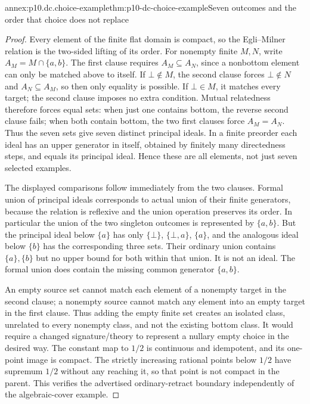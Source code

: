 \begin{annexitem}{annex:p10.dc.choice-example}{thm:p10-dc-choice-example}{Seven outcomes and the order that choice does not replace}
\begin{proof}
Every element of the finite flat domain is compact, so the Egli--Milner
relation is the two-sided lifting of its order. For nonempty finite
\(M,N\), write \(A_M=M\cap\{a,b\}\).
The first clause requires \(A_M\subseteq A_N\), since a nonbottom
element can only be matched above to itself. If \(\bot\notin M\),
the second clause forces \(\bot\notin N\) and
\(A_N\subseteq A_M\), so then only equality is possible.
If \(\bot\in M\), it matches every target; the second clause imposes
no extra condition. Mutual relatedness therefore forces equal sets:
when just one contains bottom, the reverse second clause fails; when
both contain bottom, the two first clauses force \(A_M=A_N\).
Thus the seven sets give seven distinct principal ideals.
In a finite preorder each ideal has an upper generator in itself,
obtained by finitely many directedness steps, and equals its principal
ideal. Hence these are all elements, not just seven selected examples.

The displayed comparisons follow immediately from the two clauses.
Formal union of principal ideals corresponds to actual union of their
finite generators, because the relation is reflexive and the union
operation preserves its order. In particular the union of the two
singleton outcomes is represented by \(\{a,b\}\).
But the principal ideal below \(\{a\}\) has only \(\{\bot\}\),
\(\{\bot,a\}\), \(\{a\}\), and the analogous ideal below \(\{b\}\)
has the corresponding three sets. Their ordinary union contains
\(\{a\},\{b\}\) but no upper bound for both within that union.
It is not an ideal. The formal union does contain the missing common
generator \(\{a,b\}\).

An empty source set cannot match each element of a nonempty target in
the second clause; a nonempty source cannot match any element into an
empty target in the first clause. Thus adding the empty finite set
creates an isolated class, unrelated to every nonempty class, and not
the existing bottom class. It would require a changed signature/theory
to represent a nullary empty choice in the desired way.
The constant map to \(1/2\) is continuous and idempotent, and its
one-point image is compact. The strictly increasing rational points
below \(1/2\) have supremum \(1/2\) without any reaching it, so that
point is not compact in the parent. This verifies the advertised
ordinary-retract boundary independently of the algebraic-cover example.
\end{proof}
\end{annexitem}
